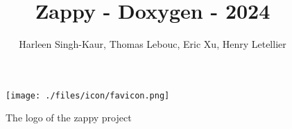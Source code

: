 \documentclass{article}
\title{Zappy - Doxygen - 2024}
\author{Harleen Singh-Kaur, Thomas Lebouc, Eric Xu, Henry Letellier}
\date{} %
\begin{document}
\maketitle

\begin{figure}[h]
    \centering
    \texttt{[image: ./files/icon/favicon.png]}
    \caption*{The logo of the zappy project}
\end{figure}
\end{document}
